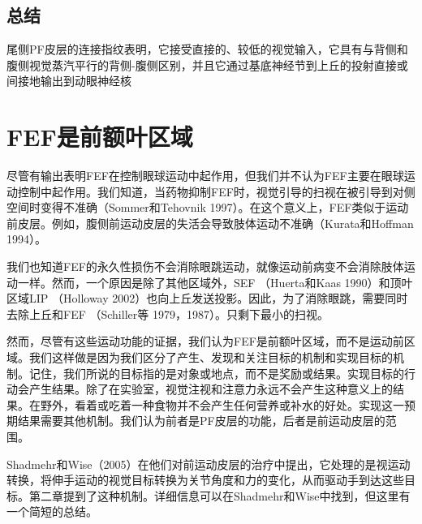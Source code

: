 \subsection{总结}
尾侧PF皮层的连接指纹表明，它接受直接的、较低的视觉输入，它具有与背侧和腹侧视觉蒸汽平行的背侧-腹侧区别，并且它通过基底神经节到上丘的投射直接或间接地输出到动眼神经核

\section{FEF是前额叶区域}
尽管有输出表明FEF在控制眼球运动中起作用，但我们并不认为FEF主要在眼球运动控制中起作用。我们知道，当药物抑制FEF时，视觉引导的扫视在被引导到对侧空间时变得不准确（Sommer和Tehovnik 1997）。在这个意义上，FEF类似于运动前皮层。例如，腹侧前运动皮层的失活会导致肢体运动不准确（Kurata和Hoffman 1994）。

我们也知道FEF的永久性损伤不会消除眼跳运动，就像运动前病变不会消除肢体运动一样。然而，一个原因是除了其他区域外，SEF （Huerta和Kaas 1990）和顶叶区域LIP （Holloway 2002）也向上丘发送投影。因此，为了消除眼跳，需要同时去除上丘和FEF （Schiller等 1979，1987）。只剩下最小的扫视。

然而，尽管有这些运动功能的证据，我们认为FEF是前额叶区域，而不是运动前区域。我们这样做是因为我们区分了产生、发现和关注目标的机制和实现目标的机制。记住，我们所说的目标指的是对象或地点，而不是奖励或结果。实现目标的行动会产生结果。除了在实验室，视觉注视和注意力永远不会产生这种意义上的结果。在野外，看着或吃着一种食物并不会产生任何营养或补水的好处。实现这一预期结果需要其他机制。我们认为前者是PF皮层的功能，后者是前运动皮层的范围。

Shadmehr和Wise（2005）在他们对前运动皮层的治疗中提出，它处理的是视运动转换，将伸手运动的视觉目标转换为关节角度和力的变化，从而驱动手到达这些目标。第二章提到了这种机制。详细信息可以在Shadmehr和Wise中找到，但这里有一个简短的总结。

